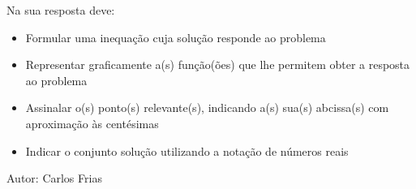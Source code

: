 \documentclass[11pt, a4paper]{article}
\begin{document}
\begin{questoes}
\begin{questoes}
        Na sua resposta deve:
        \begin{itemize}
            \item Formular uma inequação cuja solução responde ao problema
            \item Representar graficamente a(s) função(ões) que lhe permitem obter a resposta ao problema
            \item Assinalar o(s) ponto(s) relevante(s), indicando a(s) sua(s) abcissa(s) com aproximação às centésimas
            \item Indicar o conjunto solução utilizando a notação de números reais
        \end{itemize}
	\end{questoes}
\end{questoes}
\begin{flushright}
	Autor: Carlos Frias
\end{flushright}
\end{document}
